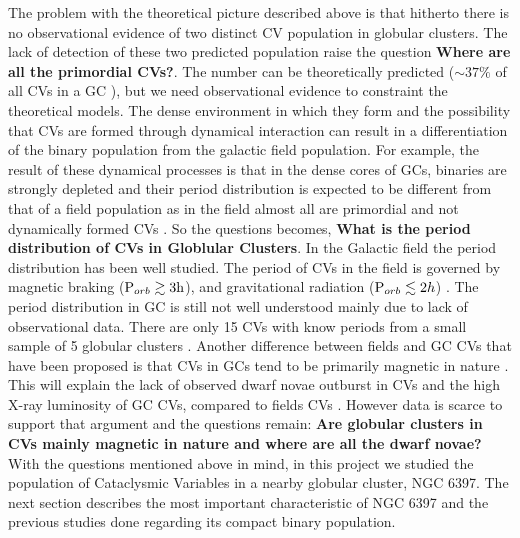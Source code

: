 The problem with the theoretical picture described above is that hitherto there is no observational evidence of two distinct CV population in globular clusters. The lack of detection of these two predicted population raise the question \textbf{Where are all the primordial CVs?}. The number can be theoretically predicted ($\sim 37 \%$ of all CVs in a GC \citep{ivanova_formation_2006}), but we need observational evidence to constraint the theoretical models. The dense environment in which they form and the possibility that CVs are formed through dynamical interaction can result in a differentiation of the binary population from the galactic field population. For example, the result of these dynamical processes is that in the dense cores of GCs, binaries are strongly depleted and their period distribution is expected to be different from that of a field population as in the field almost all are primordial and not dynamically formed CVs \citep{ivanova_evolution_2005}. So the questions becomes, \textbf{What is the period distribution of CVs in Globlular Clusters}. In the Galactic field the period distribution has been well studied. The period of CVs in the field is governed by magnetic braking ($\text P _{orb} \gtrsim  3 \text h$), and gravitational radiation ($\text P _{orb} \lesssim 2 h$) \citep{Robinson_period_1983}. The period distribution in GC is still not well understood mainly due to lack of observational data. There are only 15 CVs with know periods from a small sample of 5 globular clusters \citep{knigge_cataclysmic_2012}. Another difference between fields and GC CVs that have been proposed is that CVs in GCs tend to be primarily magnetic in nature \citep{grindlay_magnetic_1999}. This will explain the lack of observed dwarf novae outburst in CVs \citep{shara_CVsDN_1996} and the high X-ray luminosity of GC CVs, compared to fields CVs \citep{verbunt_cataclysmic_1997}. However data is scarce to support that argument and the questions remain: \textbf{Are globular clusters in CVs mainly magnetic in nature and where are all the dwarf novae?} \\

With the questions mentioned above in mind, in this project we studied the population of Cataclysmic Variables in a nearby globular cluster, NGC 6397. The next section describes the most important characteristic of NGC 6397 and the previous studies done regarding its compact binary population. 



